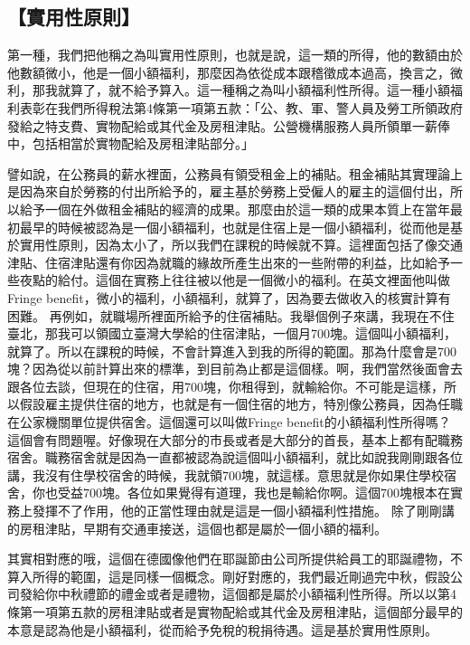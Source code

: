 \documentclass[]{ctexbook}
\begin{document}
\hypertarget{ux5be6ux7528ux6027ux539fux5247}{%
\subsection{【實用性原則】}\label{ux5be6ux7528ux6027ux539fux5247}}

第一種，我們把他稱之為叫實用性原則，也就是說，這一類的所得，他的數額由於他數額微小，他是一個小額福利，那麼因為依從成本跟稽徵成本過高，換言之，微利，那我就算了，就不給予算入。這一種稱之為叫小額福利性所得。這一種小額福利表彰在我們所得稅法第4條第一項第五款：「公、教、軍、警人員及勞工所領政府發給之特支費、實物配給或其代金及房租津貼。公營機構服務人員所領單一薪俸中，包括相當於實物配給及房租津貼部分。」

譬如說，在公務員的薪水裡面，公務員有領受租金上的補貼。租金補貼其實理論上是因為來自於勞務的付出所給予的，雇主基於勞務上受僱人的雇主的這個付出，所以給予一個在外做租金補貼的經濟的成果。那麼由於這一類的成果本質上在當年最初最早的時候被認為是一個小額福利，也就是住宿上是一個小額福利，從而他是基於實用性原則，因為太小了，所以我們在課稅的時候就不算。這裡面包括了像交通津貼、住宿津貼還有你因為就職的緣故所產生出來的一些附帶的利益，比如給予一些夜點的給付。這個在實務上往往被以他是一個微小的福利。在英文裡面他叫做Fringe benefit，微小的福利，小額福利，就算了，因為要去做收入的核實計算有困難。
再例如，就職場所裡面所給予的住宿補貼。我舉個例子來講，我現在不住臺北，那我可以領國立臺灣大學給的住宿津貼，一個月700塊。這個叫小額福利，就算了。所以在課稅的時候，不會計算進入到我的所得的範圍。那為什麼會是700塊？因為從以前計算出來的標準，到目前為止都是這個樣。啊，我們當然後面會去跟各位去談，但現在的住宿，用700塊，你租得到，就輸給你。不可能是這樣，所以假設雇主提供住宿的地方，也就是有一個住宿的地方，特別像公務員，因為任職在公家機關單位提供宿舍。這個還可以叫做Fringe benefit的小額福利性所得嗎？這個會有問題喔。好像現在大部分的市長或者是大部分的首長，基本上都有配職務宿舍。職務宿舍就是因為一直都被認為說這個叫小額福利，就比如說我剛剛跟各位講，我沒有住學校宿舍的時候，我就領700塊，就這樣。意思就是你如果住學校宿舍，你也受益700塊。各位如果覺得有道理，我也是輸給你啊。這個700塊根本在實務上發揮不了作用，他的正當性理由就是這是一個小額福利性措施。
除了剛剛講的房租津貼，早期有交通車接送，這個也都是屬於一個小額的福利。

其實相對應的哦，這個在德國像他們在耶誕節由公司所提供給員工的耶誕禮物，不算入所得的範圍，這是同樣一個概念。剛好對應的，我們最近剛過完中秋，假設公司發給你中秋禮節的禮金或者是禮物，這個都是屬於小額福利性所得。所以以第4條第一項第五款的房租津貼或者是實物配給或其代金及房租津貼，這個部分最早的本意是認為他是小額福利，從而給予免稅的稅捐待遇。這是基於實用性原則。
\end{document}
